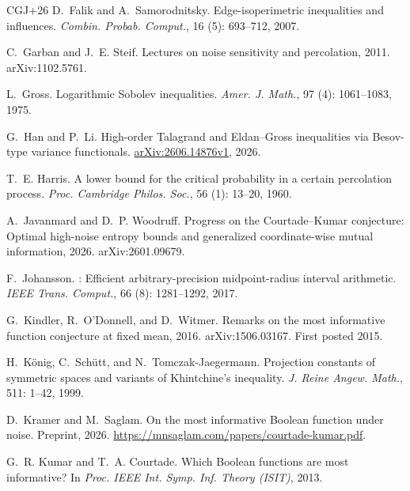 \documentclass[11pt,letterpaper]{amsart}
\newcommand{\1}{\mathbf 1}
\numberwithin{equation}{section}
\begin{document}
\begin{thebibliography}{CGJ+26}
D.~Falik and A.~Samorodnitsky.
\newblock Edge-isoperimetric inequalities and influences.
\newblock \emph{Combin. Probab. Comput.}, 16
(5): 693--712, 2007.


C.~Garban and J.~E. Steif.
\newblock Lectures on noise sensitivity and percolation, 2011.
\newblock arXiv:1102.5761.

L.~Gross.
\newblock Logarithmic {Sobolev} inequalities.
\newblock \emph{Amer. J. Math.}, 97 (4):
1061--1083, 1975.

G.~Han and P.~Li.
\newblock High-order Talagrand and Eldan--Gross inequalities via
Besov-type variance functionals.
\newblock \href{https://arxiv.org/abs/2606.14876v1}{arXiv:2606.14876v1}, 2026.

T.~E. Harris.
\newblock A lower bound for the critical probability in a certain percolation
process.
\newblock \emph{Proc. Cambridge Philos. Soc.},
56 (1): 13--20, 1960.

A.~Javanmard and D.~P. Woodruff.
\newblock Progress on the {Courtade--Kumar} conjecture: Optimal high-noise
entropy bounds and generalized coordinate-wise mutual information, 2026.
\newblock arXiv:2601.09679.

F.~Johansson.
: Efficient arbitrary-precision midpoint-radius interval
arithmetic.
\newblock \emph{IEEE Trans. Comput.}, 66 (8):
1281--1292, 2017.

G.~Kindler, R.~O'Donnell, and D.~Witmer.
\newblock Remarks on the most informative function conjecture at fixed mean,
2016.
\newblock arXiv:1506.03167.
\newblock First posted 2015.

H.~K\"onig, C.~Sch\"utt, and N.~Tomczak-Jaegermann.
\newblock Projection constants of symmetric spaces and variants of
{Khintchine's} inequality.
\newblock \emph{J. Reine Angew. Math.},
511: 1--42, 1999.

D.~Kramer and M.~Saglam.
\newblock On the most informative {Boolean} function under noise.
\newblock Preprint, 2026.
\newblock \url{https://mnsaglam.com/papers/courtade-kumar.pdf}.

G.~R. Kumar and T.~A. Courtade.
\newblock Which {Boolean} functions are most informative?
\newblock In \emph{Proc. IEEE Int. Symp. Inf. Theory (ISIT)}, 2013.


\end{thebibliography}
\end{document}
